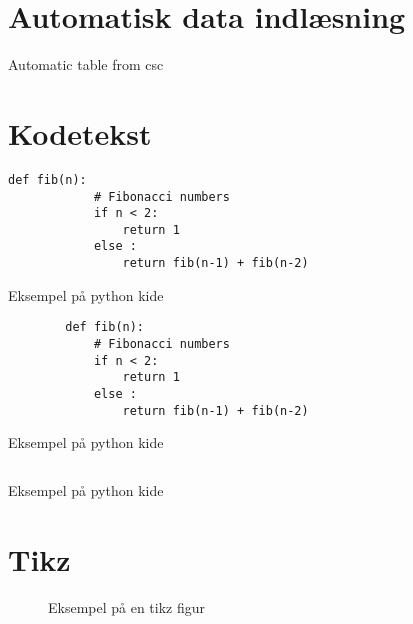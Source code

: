 \documentclass{article}
\begin{document}
\section{Automatisk data indlæsning}
\begin{table}[h]
	\centering{}
	\caption{Automatic table from csc}\label{table:dices}
\end{table}

\section{Kodetekst}
\begin{listing}[!h]
	\begin{lstlisting}[tabsize=1]
		def fib(n):
			# Fibonacci numbers
			if n < 2:
				return 1
			else :
				return fib(n-1) + fib(n-2)
		\end{lstlisting}
	\caption{Eksempel på python kide}\label{lst:par}
\end{listing}

\begin{listing}[!h]
	\begin{verbatim}
		def fib(n):
			# Fibonacci numbers
			if n < 2:
				return 1
			else :
				return fib(n-1) + fib(n-2)
		\end{verbatim}
	\caption{Eksempel på python kide}\label{lst:par}
\end{listing}

\begin{listing}[!h]
	\inputminted[firstline=0, lastline=12]{python}{assets/generator.py}
	\caption{Eksempel på python kide}\label{lst:par}
\end{listing}

\section{Tikz}
\begin{figure}[h]
	\centering
	\caption{Eksempel på en tikz figur}\label{fig:tikz}
\end{figure}
\end{document}

